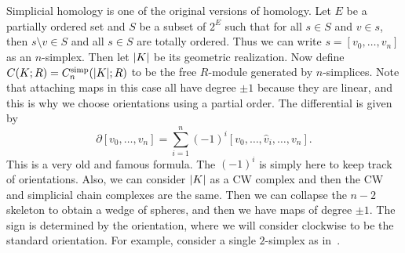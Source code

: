 \documentclass[leqno, openany]{memoir}
\theoremstyle{definition}
\theoremstyle{remark}
\theoremstyle{plain}
\theoremstyle{definition}
\theoremstyle{remark}
\newcommand{\mr}[1]{\mathrm{#1}}
\newcommand{\wh}[1]{\widehat{#1}}
\begin{document}
Simplicial homology is one of the original versions of homology. Let $E$ be a partially ordered set and $S$ be a subset of $2^E$ such that for all $s \in S$ and $v \in s$, then $s \setminus v \in S$ and all $s \in S$ are totally ordered. Thus we can write $s = [v_0, \ldots, v_n]$ as an $n$-simplex. Then let $\abs{K}$ be its geometric realization. Now define $C(K; R) = C_n^{\mr{simp}}(\abs{K}; R)$ to be the free $R$-module generated by $n$-simplices. Note that attaching maps in this case all have degree $\pm 1$ because they are linear, and this is why we choose orientations using a partial order. The differential is given by
\[ \partial [v_0, \ldots, v_n] = \sum_{i=1}^n {(-1)}^i [v_0, \ldots, \wh{v}_i, \ldots, v_n]. \]
This is a very old and famous formula. The $(-1)^i$ is simply here to keep track of orientations. Also, we can consider $\abs{K}$ as a CW complex and then the CW and simplicial chain complexes are the same. Then we can collapse the $n-2$ skeleton to obtain a wedge of spheres, and then we have maps of degree $\pm 1$. The sign is determined by the orientation, where we will consider clockwise to be the standard orientation. For example, consider a single $2$-simplex as in~.
\end{document}

